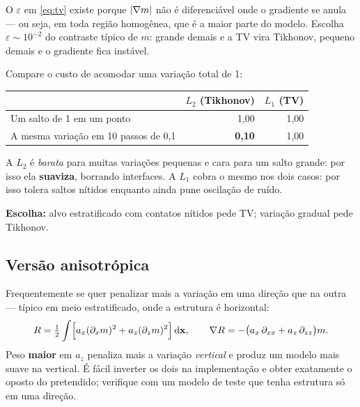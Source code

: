 \documentclass[11pt,a4paper,oneside]{report}
\begin{document}
O $\varepsilon$ em \eqref{eq:tv} existe porque $\lvert \nabla m \rvert$ n\~ao \'e
diferenci\'avel onde o gradiente se anula --- ou seja, em toda regi\~ao
homog\^enea, que \'e a maior parte do modelo. Escolha
$\varepsilon \sim 10^{-2}$ do contraste t\'ipico de $m$: grande demais e a TV
vira Tikhonov, pequeno demais e o gradiente fica inst\'avel.

\begin{teoria}
Compare o custo de acomodar uma varia\c{c}\~ao total de 1:

\begin{center}
\begin{tabular}{@{}lrr@{}}
\toprule
 & $L_2$ (Tikhonov) & $L_1$ (TV) \\
\midrule
Um salto de 1 em um ponto & 1{,}00 & 1{,}00 \\
A mesma varia\c{c}\~ao em 10 passos de 0{,}1 & \textbf{0{,}10} & 1{,}00 \\
\bottomrule
\end{tabular}
\end{center}

A $L_2$ \'e \emph{barata} para muitas varia\c{c}\~oes pequenas e cara para um
salto grande: por isso ela \textbf{suaviza}, borrando interfaces. A $L_1$ cobra
o mesmo nos dois casos: por isso tolera saltos n\'itidos enquanto ainda pune
oscila\c{c}\~ao de ru\'ido.

\textbf{Escolha:} alvo estratificado com contatos n\'itidos pede TV;
varia\c{c}\~ao gradual pede Tikhonov.
\end{teoria}

\subsection*{Vers\~ao anisotr\'opica}

Frequentemente se quer penalizar mais a varia\c{c}\~ao em uma dire\c{c}\~ao
que na outra --- t\'ipico em meio estratificado, onde a estrutura \'e
horizontal:
\begin{equation}
R = \tfrac{1}{2}\int \Bigl[a_x (\partial_x m)^{2}
  + a_z (\partial_z m)^{2}\Bigr]\,\mathrm{d}\mathbf{x},
\qquad
\nabla R = -\bigl(a_x\,\partial_{xx} + a_z\,\partial_{zz}\bigr) m .
\end{equation}
Peso \textbf{maior} em $a_z$ penaliza mais a varia\c{c}\~ao \emph{vertical} e
produz um modelo mais suave na vertical. \'E f\'acil inverter os dois
na implementa\c{c}\~ao e obter exatamente o oposto do pretendido; verifique
com um modelo de teste que tenha estrutura s\'o em uma dire\c{c}\~ao.
\end{document}
